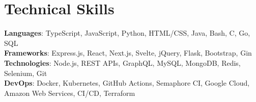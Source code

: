 \section{Technical Skills}
    \begin{itemize}[leftmargin=0.15in, label={}]
	\small{\item{
		\textbf{Languages}{: TypeScript, JavaScript, Python, HTML/CSS, Java, Bash, C, Go, SQL} \\
		\textbf{Frameworks}{: Express.js, React, Next.js, Svelte, jQuery, Flask, Bootstrap, Gin} \\
		\textbf{Technologies}{: Node.js, REST APIs, GraphQL, MySQL, MongoDB, Redis, Selenium, Git} \\
		\textbf{DevOps}{: Docker, Kubernetes, GitHub Actions, Semaphore CI, Google Cloud, Amazon Web Services, CI/CD, Terraform}
	}}
    \end{itemize}
